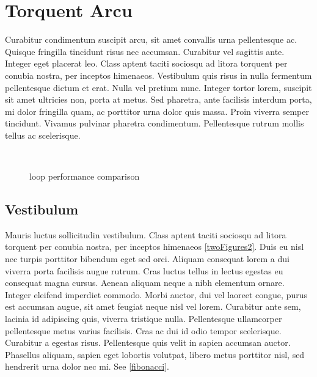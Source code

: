\section{Torquent Arcu}
Curabitur condimentum suscipit arcu, sit amet convallis urna pellentesque ac. Quisque fringilla tincidunt risus nec accumsan. Curabitur vel sagittis ante. Integer eget placerat leo. Class aptent taciti sociosqu ad litora torquent per conubia nostra, per inceptos himenaeos. Vestibulum quis risus in nulla fermentum pellentesque dictum et erat. Nulla vel pretium nunc. Integer tortor lorem, suscipit sit amet ultricies non, porta at metus. Sed pharetra, ante facilisis interdum porta, mi dolor fringilla quam, ac porttitor urna dolor quis massa. Proin viverra semper tincidunt. Vivamus pulvinar pharetra condimentum. Pellentesque rutrum mollis tellus ac scelerisque.

\begin{figure}
    \centering
        ~
        \caption{loop performance comparison}
    \label{twoFigures}
\end{figure}

\subsection{Vestibulum}
Mauris luctus sollicitudin vestibulum. Class aptent taciti sociosqu ad litora torquent per conubia nostra, per inceptos himenaeos \cref{twoFigures2}. Duis eu nisl nec turpis porttitor bibendum eget sed orci. Aliquam consequat lorem a dui viverra porta facilisis augue rutrum. Cras luctus tellus in lectus egestas eu consequat magna cursus. Aenean aliquam neque a nibh elementum ornare. Integer eleifend imperdiet commodo. Morbi auctor, dui vel laoreet congue, purus est accumsan augue, sit amet feugiat neque nisl vel lorem. Curabitur ante sem, lacinia id adipiscing quis, viverra tristique nulla. Pellentesque ullamcorper pellentesque metus varius facilisis. Cras ac dui id odio tempor scelerisque. Curabitur a egestas risus. Pellentesque quis velit in sapien accumsan auctor. Phasellus aliquam, sapien eget lobortis volutpat, libero metus porttitor nisl, sed hendrerit urna dolor nec mi. See \cref{fibonacci}.

